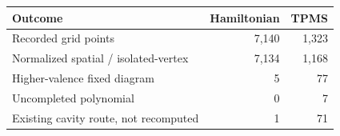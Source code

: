 \begin{tabular}{lrr}\toprule
Outcome & Hamiltonian & TPMS \\ \midrule
Recorded grid points & 7,140 & 1,323 \\
Normalized spatial / isolated-vertex & 7,134 & 1,168 \\
Higher-valence fixed diagram & 5 & 77 \\
Uncompleted polynomial & 0 & 7 \\
Existing cavity route, not recomputed & 1 & 71 \\
\bottomrule\end{tabular}